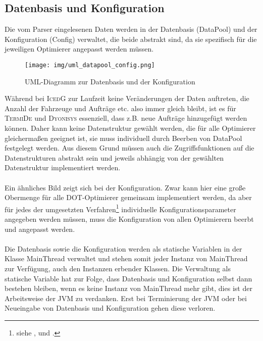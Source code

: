 \subsection{Datenbasis und Konfiguration}\label{chp:datapool_config}
Die vom Parser eingelesenen Daten werden in der Datenbasis (\textsf{DataPool}) und der Konfiguration (\textsf{Config}) verwaltet, die beide abstrakt sind, da sie spezifisch für die jeweiligen Optimierer angepasst werden müssen. \\

\begin{wrapfigure}{r}{0.6\textwidth}
  \vspace{-56pt}
  \begin{center}
    \texttt{[image: img/uml\_datapool\_config.png]}
  \end{center}
  \vspace{-20pt}
  \caption{UML-Diagramm zur Datenbasis und der Konfiguration}
  \label{fig:dyonisys}
 \vspace{-11pt}
\end{wrapfigure}

\noindent
Während bei \textsc{IcedG} zur Laufzeit keine Veränderungen der Daten auftreten, die Anzahl der Fahrzeuge und Aufträge etc. also immer gleich bleibt, ist es für \textsc{TermiDe} und \textsc{Dyonisys} essenziell, dass z.B. neue Aufträge hinzugefügt werden können. Daher kann keine Datenstruktur gewählt werden, die für alle Optimierer gleichermaßen geeignet ist, sie muss individuell durch Beerben von \textsf{DataPool} festgelegt werden. Aus diesem Grund müssen auch die Zugriffsfunktionen auf die Datenstrukturen abstrakt sein und jeweils abhängig von der gewählten Datenstruktur implementiert werden. \\
\\
Ein ähnliches Bild zeigt sich bei der Konfiguration. Zwar kann hier eine große Obermenge für alle \textsc{DOT}-Optimierer gemeinsam implementiert werden, da aber für jedes der umgesetzten Verfahren\footnote{siehe ,  und .} individuelle Konfigurationsparameter angegeben werden müssen, muss die Konfiguration von allen Optimierern beerbt und angepasst werden. \\
\\
Die Datenbasis sowie die Konfiguration werden als statische Variablen in der Klasse \textsf{MainThread} verwaltet und stehen somit jeder Instanz von \textsf{MainThread} zur Verfügung, auch den Instanzen erbender Klassen. Die Verwaltung als statische Variable hat zur Folge, dass Datenbasis und Konfiguration selbst dann bestehen bleiben, wenn es keine Instanz von \textsf{MainThread} mehr gibt, dies ist der Arbeitsweise der \textsf{JVM} zu verdanken. Erst bei Terminierung der \textsf{JVM} oder bei Neueingabe von Datenbasis und Konfiguration gehen diese verloren.


